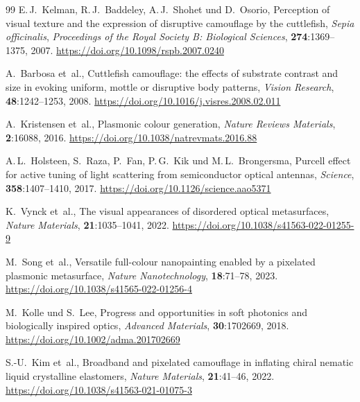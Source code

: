 ﻿\documentclass[a4paper,12pt]{article}
\theoremstyle{definition}
\begin{document}
\begin{thebibliography}{99}
		E.\,J.~Kelman, R.\,J.~Baddeley, A.\,J.~Shohet und D.~Osorio,
		\newblock Perception of visual texture and the expression of disruptive
		camouflage by the cuttlefish, \emph{Sepia officinalis},
		\newblock \emph{Proceedings of the Royal Society B: Biological Sciences},
		\textbf{274}:1369--1375, 2007.
		\newblock \url{https://doi.org/10.1098/rspb.2007.0240}
		
		A.~Barbosa et~al.,
		\newblock Cuttlefish camouflage: the effects of substrate contrast and size in
		evoking uniform, mottle or disruptive body patterns,
		\newblock \emph{Vision Research}, \textbf{48}:1242--1253, 2008.
		\newblock \url{https://doi.org/10.1016/j.visres.2008.02.011}
		
		
		A.~Kristensen et~al.,
		\newblock Plasmonic colour generation,
		\newblock \emph{Nature Reviews Materials}, \textbf{2}:16088, 2016.
		\newblock \url{https://doi.org/10.1038/natrevmats.2016.88}
		
		A.\,L.~Holsteen, S.~Raza, P.~Fan, P.\,G.~Kik und M.\,L.~Brongersma,
		\newblock Purcell effect for active tuning of light scattering from
		semiconductor optical antennas,
		\newblock \emph{Science}, \textbf{358}:1407--1410, 2017.
		\newblock \url{https://doi.org/10.1126/science.aao5371}
		
		K.~Vynck et~al.,
		\newblock The visual appearances of disordered optical metasurfaces,
		\newblock \emph{Nature Materials}, \textbf{21}:1035--1041, 2022.
		\newblock \url{https://doi.org/10.1038/s41563-022-01255-9}
		
		M.~Song et~al.,
		\newblock Versatile full-colour nanopainting enabled by a pixelated plasmonic
		metasurface,
		\newblock \emph{Nature Nanotechnology}, \textbf{18}:71--78, 2023.
		\newblock \url{https://doi.org/10.1038/s41565-022-01256-4}
		
		M.~Kolle und S.~Lee,
		\newblock Progress and opportunities in soft photonics and biologically
		inspired optics,
		\newblock \emph{Advanced Materials}, \textbf{30}:1702669, 2018.
		\newblock \url{https://doi.org/10.1002/adma.201702669}
		
		S.\mbox{-}U.~Kim et~al.,
		\newblock Broadband and pixelated camouflage in inflating chiral nematic liquid
		crystalline elastomers,
		\newblock \emph{Nature Materials}, \textbf{21}:41--46, 2022.
		\newblock \url{https://doi.org/10.1038/s41563-021-01075-3}
		

\end{thebibliography}
\end{document}
